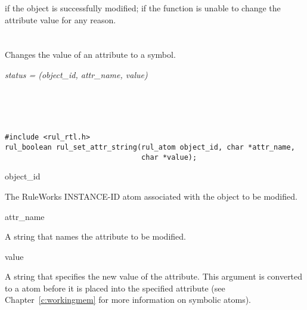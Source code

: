 \ReturnValue

 if the object is successfully modified;  if the
function is unable to change the attribute value for any reason.

\begin{seealso}
  
  

\end{seealso}

\section*{}

Changes the value of an attribute to a symbol.

\Syntax

\it{status} = (\it{object\_id},
\it{attr\_name}, \it{value})

\begin{args}
   \\
   \\
   \\
\end{args}

\CBinding
\begin{verbatim}
#include <rul_rtl.h>
rul_boolean rul_set_attr_string(rul_atom object_id, char *attr_name,
                                char *value);
\end{verbatim}

\begin{arguments}
\item[object\_id]

  The RuleWorks INSTANCE-ID atom associated with the object to be
  modified.

\item[attr\_name]

  A string that names the attribute to be modified.

\item[value]

  A string that specifies the new value of the attribute. This
  argument is converted to a  atom before it is placed into
  the specified attribute (see Chapter~\ref{c:workingmem} for more
  information on symbolic atoms).
\end{arguments}

